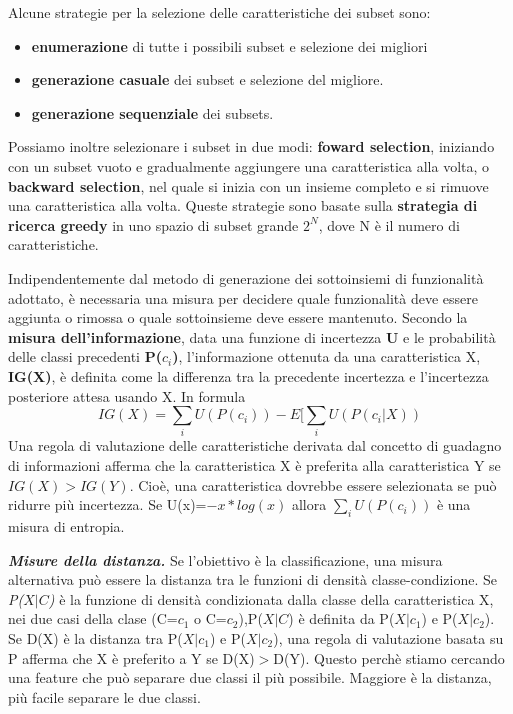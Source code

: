 \documentclass[a4paper]{extarticle}
\begin{document}
Alcune strategie per la selezione delle caratteristiche dei subset sono:
\begin{itemize}
\item \textbf{enumerazione} di tutte i possibili subset e selezione dei migliori
\item \textbf{generazione casuale} dei subset e selezione del migliore.
\item \textbf{generazione sequenziale} dei subsets.
\end{itemize}
Possiamo inoltre selezionare i subset in due modi: \textbf{foward selection}, iniziando con un subset vuoto e gradualmente aggiungere una caratteristica alla volta, o \textbf{backward selection}, nel quale si inizia con un insieme completo e si rimuove una caratteristica alla volta. Queste strategie sono basate sulla \textbf{strategia di ricerca greedy} in uno spazio di subset grande $2^N$, dove N è il numero di caratteristiche.

Indipendentemente dal metodo di generazione dei sottoinsiemi di funzionalità adottato, è necessaria una misura per decidere quale funzionalità deve essere aggiunta o rimossa o quale sottoinsieme deve essere mantenuto. Secondo la \textbf{misura dell'informazione}, data una funzione di incertezza \textbf{U} e le probabilità delle classi precedenti \textbf{P($c_i$)}, l'informazione ottenuta da una caratteristica X, \textbf{IG(X)}, è definita come la differenza tra la precedente incertezza e l'incertezza posteriore attesa usando X. In formula
\begin{equation}
IG(X)= \sum_{i} U(P(c_i))-E[\sum_{i}U(P(c_i|X))
\end{equation}
Una regola di valutazione delle caratteristiche derivata dal concetto di guadagno di informazioni afferma che la caratteristica X è preferita alla caratteristica Y se $IG(X)>IG(Y)$. Cioè, una caratteristica dovrebbe essere selezionata se può ridurre più incertezza. Se U(x)=$-x*log(x)$ allora $\sum_{i}U(P(c_i))$ è una misura di entropia.

\textbf{\textit{Misure della distanza.}} Se l'obiettivo è la classificazione, una misura alternativa può essere la distanza tra le funzioni di densità classe-condizione. Se \textit{P($X|C$)} è la funzione di densità condizionata dalla classe della caratteristica X, nei due casi della clase (C=$c_1$ o C=$c_2$),P($X|C$) è definita da P($X|c_1$) e P($X|c_2$). Se D(X) è la distanza tra P($X|c_1$) e P($X|c_2$), una regola di valutazione basata su P afferma che X è preferito a Y se D(X)$>$D(Y). Questo perchè stiamo cercando una feature che può separare due classi il più possibile. Maggiore è la distanza, più facile separare le due classi.
\end{document}
